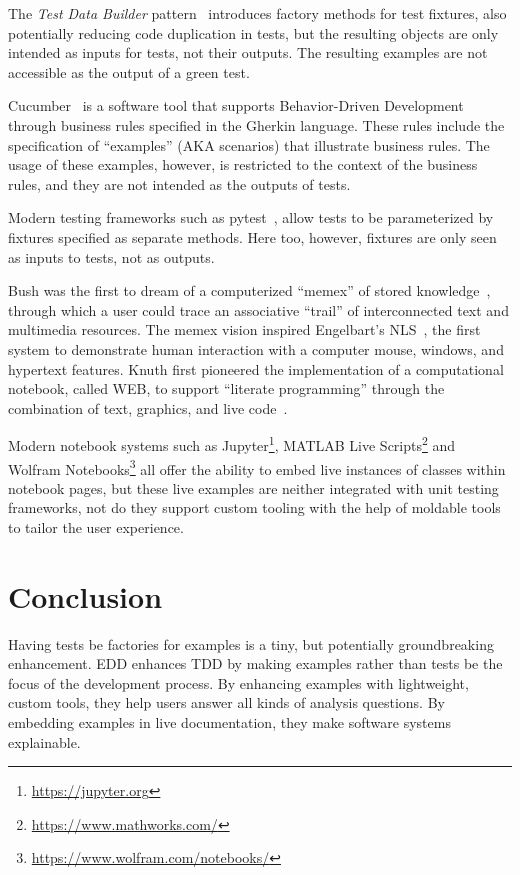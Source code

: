 \documentclass[sigplan,anonymous,review,10pt]{acmart}
\begin{document}

The \emph{Test Data Builder} pattern~\cite{Free09a} introduces factory methods for test fixtures, also potentially reducing code duplication in tests, but the resulting objects are only intended as inputs for tests, not their outputs.
The resulting examples are not accessible as the output of a green test.

Cucumber~\cite{Hell17a} is a software tool that supports Behavior-Driven Development through business rules specified in the Gherkin language.
These rules include the specification of ``examples'' (AKA scenarios) that illustrate business rules.
The usage of these examples, however, is restricted to the context of the business rules, and they are not intended as the outputs of tests.

Modern testing frameworks such as pytest~\cite{Okke22a}, allow tests to be parameterized by fixtures specified as separate methods.
Here too, however, fixtures are only seen as inputs to tests, not as outputs.

Bush was the first to dream of a computerized ``memex'' of stored knowledge~\cite{Bush45a}, through which a user could trace an associative ``trail'' of interconnected text and multimedia resources.
The memex vision inspired Engelbart's NLS~\cite{Enge68a}, the first system to demonstrate human interaction with a computer mouse, windows, and hypertext features.
Knuth first pioneered the implementation of a computational notebook, called WEB, to support ``literate programming'' through the combination of text, graphics, and live code~\cite{Knut97a}.

Modern notebook systems such as Jupyter\footnote{\url{https://jupyter.org}}, MATLAB Live Scripts\footnote{\url{https://www.mathworks.com/}} and Wolfram Notebooks\footnote{\url{https://www.wolfram.com/notebooks/}} all offer the ability to embed live instances of classes within notebook pages, but these live examples are neither integrated with unit testing frameworks, not do they support custom tooling with the help of moldable tools to tailor the user experience.

\section{Conclusion}\label{sec:conclusion}

Having tests be factories for examples is a tiny, but potentially groundbreaking enhancement.
EDD enhances TDD by making examples rather than tests be the focus of the development process.
By enhancing examples with lightweight, custom tools, they help users answer all kinds of analysis questions.
By embedding examples in live documentation, they make software systems explainable.





\end{document}
